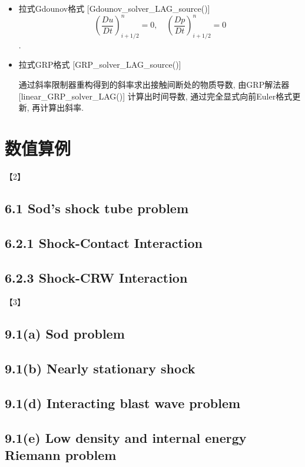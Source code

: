 \documentclass[CJK]{ctexart}
\begin{document}
\begin{itemize}
\item 拉式Gdounov格式 [Gdounov\_solver\_LAG\_source()]
$$
\left(\frac{D u}{D t}\right)_{i+1/2}^{n}=0, \quad \left(\frac{D p}{D t}\right)_{i+1/2}^{n}=0
$$. 

\item 拉式GRP格式 [GRP\_solver\_LAG\_source()]

通过斜率限制器重构得到的斜率求出接触间断处的物质导数, 由GRP解法器 [linear\_GRP\_solver\_LAG()] 计算出时间导数, 通过完全显式向前Euler格式更新, 再计算出斜率.
\end{itemize}


\section{数值算例}

【2】

\subsection*{6.1 Sod's shock tube problem}

\subsection*{6.2.1 Shock-Contact Interaction}

\subsection*{6.2.3 Shock-CRW Interaction}

【3】

\subsection*{9.1(a) Sod problem}

\subsection*{9.1(b) Nearly stationary shock}

\subsection*{9.1(d) Interacting blast wave problem}

\subsection*{9.1(e) Low density and internal energy Riemann problem}
\end{document}
